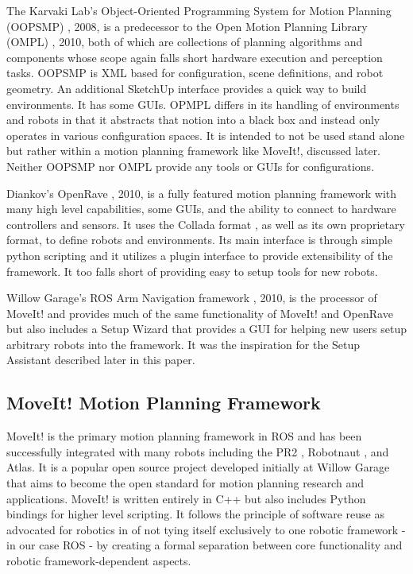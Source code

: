 \documentclass[10pt,journal,compsoc]{joser1}
\begin{document}
{The Karvaki Lab's Object-Oriented Programming System for Motion Planning (OOPSMP) \cite{oopsmp}, 2008, is a predecessor to the Open Motion Planning Library (OMPL) \cite{sucan2012the-open-motion-planning-library}, 2010, both of which are collections of planning algorithms and components whose scope again falls short hardware execution and perception tasks. OOPSMP is XML based for configuration, scene definitions, and robot geometry. An additional SketchUp interface provides a quick way to build environments. It has some GUIs. OPMPL differs in its handling of environments and robots in that it abstracts that notion into a black box and instead only operates in various configuration spaces. It is intended to not be used stand alone but rather within a motion planning framework like MoveIt!, discussed later. Neither OOPSMP nor OMPL provide any tools or GUIs for configurations.

Diankov's OpenRave  \cite{diankov2008openrave}, 2010, is a fully featured motion planning framework with many high level capabilities, some GUIs, and the ability to connect to hardware controllers and sensors. It uses the Collada format \cite{collada}, as well as its own proprietary format, to define robots and environments. Its main interface is through simple python scripting and it utilizes a plugin interface to provide extensibility of the framework. It too falls short of providing easy to setup tools for new robots. 

Willow Garage's ROS Arm Navigation framework \cite{chitta2012perception}, 2010, is the processor of MoveIt! and provides much of the same functionality of MoveIt! and OpenRave but also includes a Setup Wizard that provides a GUI for helping new users setup arbitrary robots into the framework. It was the inspiration for the Setup Assistant described later in this paper.

\subsection{MoveIt! Motion Planning Framework}
\label{sec::moveit}

MoveIt! is the primary motion planning framework in ROS and has been successfully integrated with many robots including the PR2 \cite{wyrobek2008towards}, Robotnaut \cite{ambrose2000robonaut}, and Atlas. It is a popular open source project developed initially at Willow Garage that aims to become the open standard for motion planning research and applications. MoveIt! is written entirely in C++ but also includes Python bindings for higher level scripting. It follows the principle of software reuse as advocated for robotics in \cite{makarenko2007benefits} of not tying itself exclusively to one robotic framework - in our case ROS - by creating a formal separation between core functionality and robotic framework-dependent aspects. 

}
\end{document}
